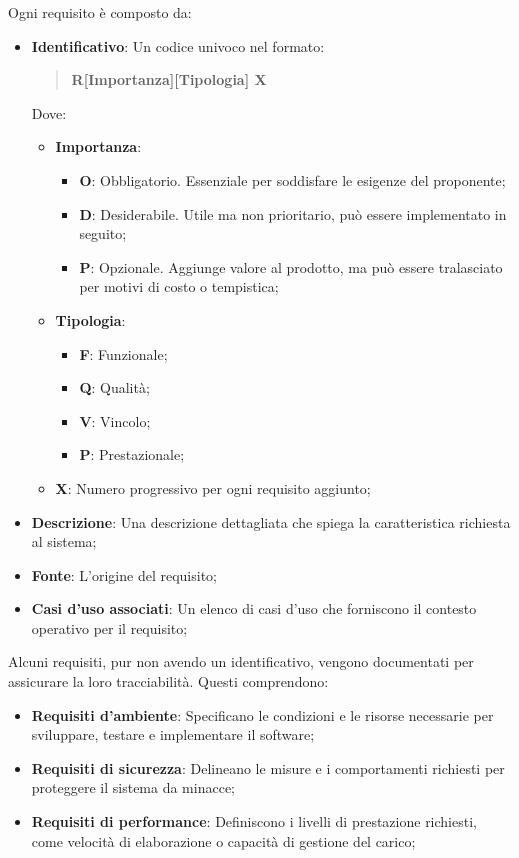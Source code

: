     Ogni requisito è composto da:
    \begin{itemize}
    \item \textbf{Identificativo}: Un codice univoco nel formato:
    \begin{quote}
    \textbf{R[{Importanza}][{Tipologia}] X}
    \end{quote}
    Dove:
    \begin{itemize}
        \item \textbf{Importanza}:
        \begin{itemize}
            \item \textbf{O}: Obbligatorio. Essenziale per soddisfare le esigenze del proponente;
            \item \textbf{D}: Desiderabile. Utile ma non prioritario, può essere implementato in seguito;
            \item \textbf{P}: Opzionale. Aggiunge valore al prodotto, ma può essere tralasciato per motivi di costo o tempistica;
        \end{itemize}
        \item \textbf{Tipologia}:
        \begin{itemize}
            \item \textbf{F}: Funzionale;
            \item \textbf{Q}: Qualità;
            \item \textbf{V}: Vincolo;
            \item \textbf{P}: Prestazionale;
        \end{itemize}
        \item \textbf{X}: Numero progressivo per ogni requisito aggiunto;
    \end{itemize}
    \item \textbf{Descrizione}: Una descrizione dettagliata che spiega la caratteristica richiesta al sistema;
    \item \textbf{Fonte}: L'origine del requisito;
    \item \textbf{Casi d’uso associati}: Un elenco di casi d'uso che forniscono il contesto operativo per il requisito;
    \end{itemize}

    Alcuni requisiti, pur non avendo un identificativo, vengono documentati per assicurare la loro tracciabilità. Questi comprendono:
    \begin{itemize}
        \item \textbf{Requisiti d’ambiente}: 
        Specificano le condizioni e le risorse necessarie per sviluppare, testare e implementare il software;
        \item \textbf{Requisiti di sicurezza}: 
        Delineano le misure e i comportamenti richiesti per proteggere il sistema da minacce;
        \item \textbf{Requisiti di performance}: 
        Definiscono i livelli di prestazione richiesti, come velocità di elaborazione o capacità di gestione del carico;
    \end{itemize}

